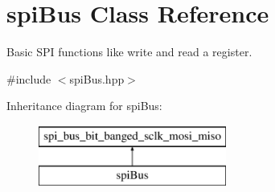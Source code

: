 \hypertarget{classspi_bus}{}\section{spi\+Bus Class Reference}
\label{classspi_bus}


Basic S\+PI functions like write and read a register.  




{\ttfamily \#include $<$spi\+Bus.\+hpp$>$}

Inheritance diagram for spi\+Bus\+:\begin{figure}[H]
\begin{center}
\leavevmode
\includegraphics[height=2.000000cm]{classspi_bus}
\end{center}
\end{figure}

